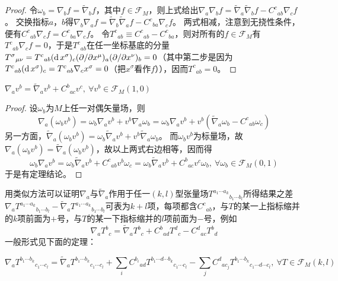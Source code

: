 \begin{proof}
令$\omega_b = \nabla_bf = \tilde\nabla_bf$，其中$f \in \mathscr{F}_M$，则上式给出$\nabla_a\nabla_bf = \tilde\nabla_a\tilde\nabla_bf - C^c{}_{ab}\nabla_cf$。
交换指标$a$，$b$得$\nabla_b\nabla_af = \tilde\nabla_b\tilde\nabla_af - C^c{}_{ba}\nabla_cf$。
两式相减，注意到无挠性条件，便有$C^c{}_{ab}\nabla_cf = C^c{}_{ba}\nabla_cf$。
令$T^c{}_{ab} \equiv C^c{}_{ab} - C^c{}_{ba}$，则对所有的$f \in \mathscr{F}_M$有$T^c{}_{ab}\nabla_cf = 0$，于是$T^c{}_{ab}$在任一坐标基底的分量$T^\sigma{}_{\mu\nu} = T^c{}_{ab}(\operatorname{d} x^\sigma)_c(\partial / \partial x^\mu)_a(\partial / \partial x^\nu)_b = 0$（其中第二步是因为$T^c{}_{ab}(\operatorname{d} x^\sigma)_c = T^c{}_{ab}\nabla_cx^\sigma = 0$（把$x^\sigma$看作$f$）），因而$T^c{}_{ab} = 0$。
\end{proof}

\begin{theorem}
$\nabla_av^b = \tilde\nabla_av^b + C^b{}_{ac}v^c, ~ \forall v^b \in \mathscr{F}_M(1, 0)$
\end{theorem}

\begin{proof}
设$\omega_b$为$M$上任一对偶矢量场，则
$$\nabla_a(\omega_bv^b) = \omega_b\nabla_av^b + v^b\nabla_a\omega_b = \omega_b\nabla_av^b + v^b(\tilde\nabla_a\omega_b - C^c{}_{ab}\omega_c)$$
另一方面，$\tilde\nabla_a(\omega_bv^b) = \omega_b\tilde\nabla_av^b + v^b\tilde\nabla_a\omega_b$。
而$\omega_bv^b$为标量场，故$\nabla_a(\omega_bv^b) = \tilde\nabla_a(\omega_bv^b)$，故以上两式右边相等，因而得
$$\omega_b\nabla_av^b = \omega_b\tilde\nabla_av^b + C^c{}_{ab}v^b\omega_c = \omega_b\tilde\nabla_av^b + C^b{}_{ac}v^c\omega_b, ~ \forall \omega_b \in \mathscr{F}_M(0, 1)$$
于是有定理结论。
\end{proof}

用类似方法可以证明$\nabla_a$与$\tilde\nabla_a$作用于任一$(k, l)$型张量场$T^{a_1 \cdots a_k}{}_{b_1 \cdots b_l}$所得结果之差$\nabla_aT^{a_1 \cdots a_k}{}_{b_1 \cdots b_l} - \tilde\nabla_aT^{a_1 \cdots a_k}{}_{b_1 \cdots b_l}$可表为$k + l$项，每项都含$C^c{}_{ab}$，与$T$的某一上指标缩并的$k$项前面为$+$号，与$T$的某一下指标缩并的$l$项前面为$-$号，例如
$$\nabla_aT^b{}_{c} = \tilde\nabla_aT^b{}_{c} + C^b{}_{ad}T^d{}_{c} - C^d{}_{ac}T^b{}_{d}$$
一般形式见下面的定理：
\begin{theorem}
$$\nabla_aT^{b_1 \cdots b_k}{}_{c_1 \cdots c_l} = \tilde\nabla_aT^{b_1 \cdots b_k}{}_{c_1 \cdots c_l} + \sum_iC^{b_i}{}_{ad}T^{b_1 \cdots d \cdots b_k}{}_{c_1 \cdots c_l} - \sum_jC^d{}_{ac_j}T^{b_1 \cdots b_k}{}_{c_1 \cdots d \cdots c_l}, ~ \forall T \in \mathscr{F}_M(k, l)$$
\end{theorem}

